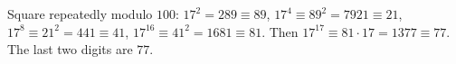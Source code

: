 Square repeatedly modulo $100$: $17^2=289\equiv89$, $17^4\equiv89^2=7921\equiv21$, $17^8\equiv21^2=441\equiv41$, $17^{16}\equiv41^2=1681\equiv81$. Then $17^{17}\equiv81\cdot17=1377\equiv77$. The last two digits are $\boxed{77}$.
